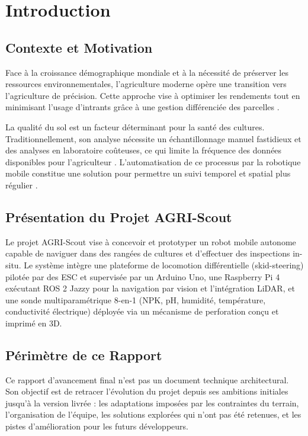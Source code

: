 \section{Introduction}

\subsection{Contexte et Motivation}

Face à la croissance démographique mondiale et à la nécessité de préserver les ressources environnementales, l'agriculture moderne opère une transition vers l'agriculture de précision. Cette approche vise à optimiser les rendements tout en minimisant l'usage d'intrants grâce à une gestion différenciée des parcelles \cite{precision_ag_review}.

La qualité du sol est un facteur déterminant pour la santé des cultures. Traditionnellement, son analyse nécessite un échantillonnage manuel fastidieux et des analyses en laboratoire coûteuses, ce qui limite la fréquence des données disponibles pour l'agriculteur \cite{soil_sensing_review}. L'automatisation de ce processus par la robotique mobile constitue une solution pour permettre un suivi temporel et spatial plus régulier \cite{agri_robotics}.

\subsection{Présentation du Projet AGRI-Scout}

Le projet AGRI-Scout vise à concevoir et prototyper un robot mobile autonome capable de naviguer dans des rangées de cultures et d'effectuer des inspections in-situ. Le système intègre une plateforme de locomotion différentielle (skid-steering) pilotée par des ESC et supervisée par un Arduino Uno, une Raspberry Pi 4 exécutant ROS 2 Jazzy pour la navigation par vision et l'intégration LiDAR, et une sonde multiparamétrique 8-en-1 (NPK, pH, humidité, température, conductivité électrique) déployée via un mécanisme de perforation conçu et imprimé en 3D.

\subsection{Périmètre de ce Rapport}

Ce rapport d'avancement final n'est pas un document technique architectural. Son objectif est de retracer l'évolution du projet depuis ses ambitions initiales jusqu'à la version livrée : les adaptations imposées par les contraintes du terrain, l'organisation de l'équipe, les solutions explorées qui n'ont pas été retenues, et les pistes d'amélioration pour les futurs développeurs.
